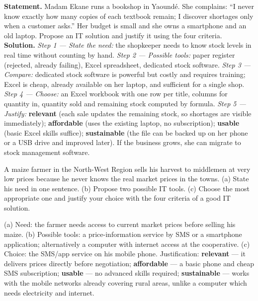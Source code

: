 \documentclass[11pt]{article}
\begin{document}
\begin{exoresolu}
\textbf{Statement.} Madam Ekane runs a bookshop in Yaound\'e. She complains: ``I never know exactly how many copies of each textbook remain; I discover shortages only when a customer asks.'' Her budget is small and she owns a smartphone and an old laptop. Propose an IT solution and justify it using the four criteria.
\tcblower
\textbf{Solution.} \emph{Step 1 --- State the need:} the shopkeeper needs to know stock levels in real time without counting by hand. \emph{Step 2 --- Possible tools:} paper register (rejected, already failing), Excel spreadsheet, dedicated stock software. \emph{Step 3 --- Compare:} dedicated stock software is powerful but costly and requires training; Excel is cheap, already available on her laptop, and sufficient for a single shop. \emph{Step 4 --- Choose:} an Excel workbook with one row per title, columns for quantity in, quantity sold and remaining stock computed by formula. \emph{Step 5 --- Justify:} \textbf{relevant} (each sale updates the remaining stock, so shortages are visible immediately); \textbf{affordable} (uses the existing laptop, no subscription); \textbf{usable} (basic Excel skills suffice); \textbf{sustainable} (the file can be backed up on her phone or a USB drive and improved later). If the business grows, she can migrate to stock management software.
\end{exoresolu}

\begin{exercice}
A maize farmer in the North-West Region sells his harvest to middlemen at very low prices because he never knows the real market prices in the towns. (a) State his need in one sentence. (b) Propose two possible IT tools. (c) Choose the most appropriate one and justify your choice with the four criteria of a good IT solution.
\end{exercice}

\begin{corrige}[Exercise 1]
(a) Need: the farmer needs access to current market prices before selling his maize. (b) Possible tools: a price-information service by SMS or a smartphone application; alternatively a computer with internet access at the cooperative. (c) Choice: the SMS/app service on his mobile phone. Justification: \textbf{relevant} --- it delivers prices directly before negotiation; \textbf{affordable} --- a basic phone and cheap SMS subscription; \textbf{usable} --- no advanced skills required; \textbf{sustainable} --- works with the mobile networks already covering rural areas, unlike a computer which needs electricity and internet.
\end{corrige}
\end{document}
